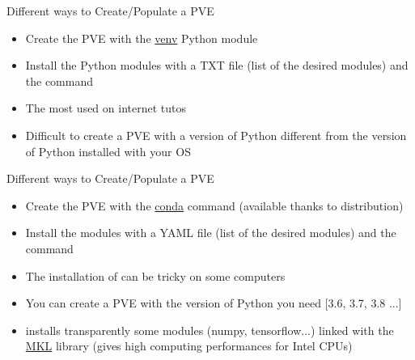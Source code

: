 \documentclass[10pt,serif,mathserif,compress,hyperref={colorlinks}]{beamer}
\begin{document}
\begin{frame}{Different ways to Create/Populate a PVE}
      
  \begin{tcolorbox}[title=The standard way: the {\bf venv} module \& \textbf{pip} command]
    \begin{itemize}
    \item Create the PVE with the \href{https://docs.python.org/3/library/venv.html}{venv} Python module
    \item Install the Python modules with a TXT file (list of the desired modules) and the command 
    \item[\happy] The most used on internet tutos
    \item[\unhappy] Difficult to create a PVE with a version of Python different from the version of Python installed with your OS
    \end{itemize}
  \end{tcolorbox}

\end{frame}

\begin{frame}{Different ways to Create/Populate a PVE}
      
  \begin{tcolorbox}[title=The preferred way: the \textbf{conda} command]
    \begin{itemize}
    \item Create the PVE with the \href{https://docs.conda.io/projects/conda/en/stable/}{conda} command 
      (available thanks to  distribution)
    \item Install the modules with a YAML file (list of the desired modules) and the command 
    \item[\unhappy] The installation of  can be tricky on some computers
    \item[\happy] You can create a PVE with the version of Python you need [3.6, 3.7, 3.8 ...]
    \item[\happy]  installs transparently some modules (numpy, tensorflow...) linked with
      the \href{https://www.intel.com/content/www/us/en/docs/onemkl/get-started-guide/2023-0/overview.html}{MKL} library
      (gives high computing performances for Intel CPUs)
    \end{itemize}
  \end{tcolorbox}

\end{frame}
\end{document}
